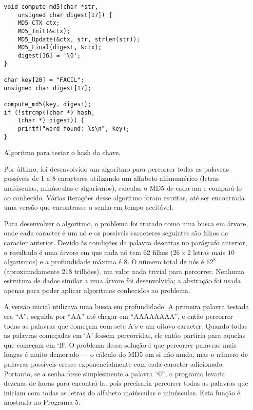 \documentclass{sig-alternate-05-2015}
\begin{document}
\begin{program}
\begin{lstlisting}
void compute_md5(char *str, 
	unsigned char digest[17]) {
    MD5_CTX ctx;
    MD5_Init(&ctx);
    MD5_Update(&ctx, str, strlen(str));
    MD5_Final(digest, &ctx);
    digest[16] = '\0';
}

char key[20] = "FACIL";
unsigned char digest[17];

compute_md5(key, digest);
if (!strcmp((char *) hash,
	(char *) digest)) {
    printf("word found: %s\n", key);
}
\end{lstlisting}
\caption{Algoritmo para testar o hash da chave.}
\end{program}

Por último, foi desenvolvido um algoritmo para percorrer todas as palavras possíveis de 1 a 8 caracteres utilizando um alfabeto alfanumérico (letras maiúsculas, minúsculas e algarismos), calcular o MD5 de cada um e compará-lo ao conhecido.
Várias iterações desse algoritmo foram escritas, até ser encontrada uma versão que encontrasse a senha em tempo aceitável.

Para desenvolver o algoritmo, o problema foi tratado como uma busca em árvore, onde cada caracter é um nó e os possíveis caracteres seguintes são filhos do caracter anterior.
Devido às condições da palavra descritas no parágrafo anterior, o resultado é uma árvore em que cada nó tem 62 filhos ($26\times 2$ letras mais $10$ algarismos) e a profundidade máxima é 8.
O número total de nós é $62^8$ (aproximadamente 218 trilhões), um valor nada trivial para percorrer.
Nenhuma estrutura de dados similar a uma árvore foi desenvolvida; a abstração foi usada apenas para poder aplicar algoritmos conhecidos ao problema.

A versão inicial utilizava uma busca em profundidade.
A primeira palavra testada era ``A'', seguida por ``AA'' até chegar em ``AAAAAAAA'', e então percorrer todas as palavras que começam com sete A's e um oitavo caracter.
Quando todas as palavras começadas em `A' fossem percorridas, ele então partiria para aquelas que começam em `B'.
O problema dessa solução é que percorrer palavras mais longas é muito demorado — o cálculo do MD5 em si não muda, mas o número de palavras possíveis cresce exponencialmente com cada caracter adicionado.
Portanto, se a senha fosse simplesmente a palavra ``0'', o programa levaria dezenas de horas para encontrá-la, pois precisaria percorrer  todas as palavras que iniciam com todas as letras do alfabeto maiúsculas e minúsculas.
Esta função é mostrada no Programa 5.
\end{document}
